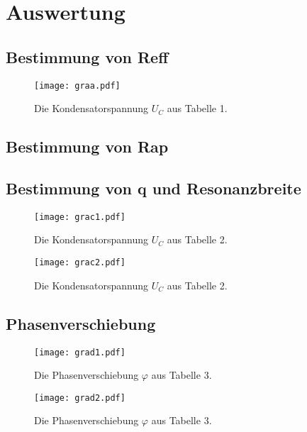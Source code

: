 \section{Auswertung}
\label{sec:Auswertung}

\subsection{Bestimmung von Reff}
\begin{figure}[H]
	\centering
	\caption{Die Kondensatorspannung $U_C$ aus Tabelle 1.}
	\texttt{[image: graa.pdf]}
	\label{fig:graa}
\end{figure}


\subsection{Bestimmung von Rap}

\subsection{Bestimmung von q und Resonanzbreite}
\begin{figure}[H]
	\centering
	\caption{Die Kondensatorspannung $U_C$ aus Tabelle 2.}
	\texttt{[image: grac1.pdf]}
	\label{fig:grac1}
\end{figure}
\begin{figure}[H]
	\centering
	\caption{Die Kondensatorspannung $U_C$ aus Tabelle 2.}
	\texttt{[image: grac2.pdf]}
	\label{fig:grac2}
\end{figure}


\subsection{Phasenverschiebung}
\begin{figure}[H]
	\centering
	\caption{Die Phasenverschiebung $\varphi$ aus Tabelle 3.}
	\texttt{[image: grad1.pdf]}
	\label{fig:grad1}
\end{figure}
\begin{figure}[H]
	\centering
	\caption{Die Phasenverschiebung $\varphi$ aus Tabelle 3.}
	\texttt{[image: grad2.pdf]}
	\label{fig:grad2}
\end{figure}


